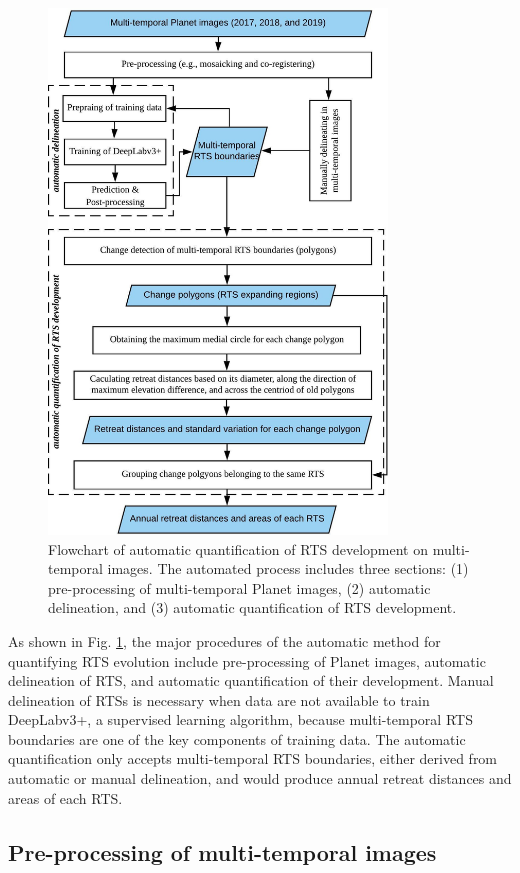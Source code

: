 \documentclass[authoryear,preprint,review,12pt]{elsarticle}
\begin{document}
\begin{figure}
	\centering
	\includegraphics[width=9cm]{figs/polygon_based_change_detection_flowchart.jpg}
	\caption{Flowchart of automatic quantification of RTS development on multi-temporal images. The automated process includes three sections: (1) pre-processing of multi-temporal Planet images, (2) automatic delineation, and (3) automatic quantification of RTS development.}
	\label{fig_flowchart}
\end{figure}

 As shown in Fig. \ref{fig_flowchart}, the major procedures of the automatic method for quantifying RTS evolution include pre-processing of Planet images, automatic delineation of RTS, and automatic quantification of their development. 
Manual delineation of RTSs is necessary when data are not available to train DeepLabv3+, a supervised learning algorithm, because multi-temporal RTS boundaries are one of the key components of training data.
The automatic quantification only accepts multi-temporal RTS boundaries, either derived from automatic or manual delineation, and would produce annual retreat distances and areas of each RTS. 


\subsection{Pre-processing of multi-temporal images}
\label{sec_preprocessing}
\end{document}

